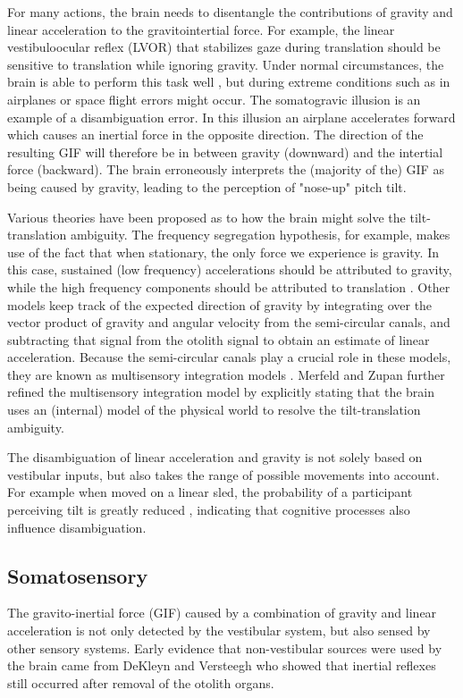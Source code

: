 For many actions, the brain needs to disentangle the contributions of gravity and linear acceleration to the gravitointertial force. For example, the linear vestibuloocular reflex (LVOR) that stabilizes gaze during translation should be sensitive to translation while ignoring gravity. Under normal circumstances, the brain is able to perform this task well \cite{merfeld1995}, but during extreme conditions such as in airplanes or space flight errors might occur. The somatogravic illusion \cite{glasauer1995} is an example of a disambiguation error. In this illusion an airplane accelerates forward which causes an inertial force in the opposite direction. The direction of the resulting GIF will therefore be in between gravity (downward) and the intertial force (backward). The brain erroneously interprets the (majority of the) GIF as being caused by gravity, leading to the perception of "nose-up" pitch tilt.

Various theories have been proposed as to how the brain might solve the tilt-translation ambiguity. The frequency segregation hypothesis, for example, makes use of the fact that when stationary, the only force we experience is gravity. In this case, sustained (low frequency) accelerations should be  attributed to gravity, while the high frequency components should be attributed to translation \cite{paige1991, telford1997}. Other models keep track of the expected direction of gravity by integrating over the vector product of gravity and angular velocity from the semi-circular canals, and subtracting that signal from the otolith signal to obtain an estimate of linear acceleration. Because the semi-circular canals play a  crucial role in these models, they are known as multisensory integration models \cite{mayne1974,ormsby1977}. Merfeld and Zupan \citeyear{merfeld1995,merfeld2002} further refined the multisensory integration model by explicitly stating that the brain uses an (internal) model of the physical world to resolve the tilt-translation ambiguity.

The disambiguation of linear acceleration and gravity is not solely based on vestibular inputs, but also takes the  range of  possible movements into account. For example when moved on a linear sled, the probability of a participant perceiving tilt is greatly reduced \cite{wertheim2001}, indicating that cognitive processes also influence disambiguation.


\subsection{Somatosensory}
The gravito-inertial force (GIF) caused by a combination of gravity and linear acceleration is not only detected by the vestibular system, but also sensed by other sensory systems. Early evidence that non-vestibular sources were used by the brain came from DeKleyn and Versteegh \citeyear{dekleyn1933} who showed that inertial reflexes still occurred after removal of the otolith organs.


